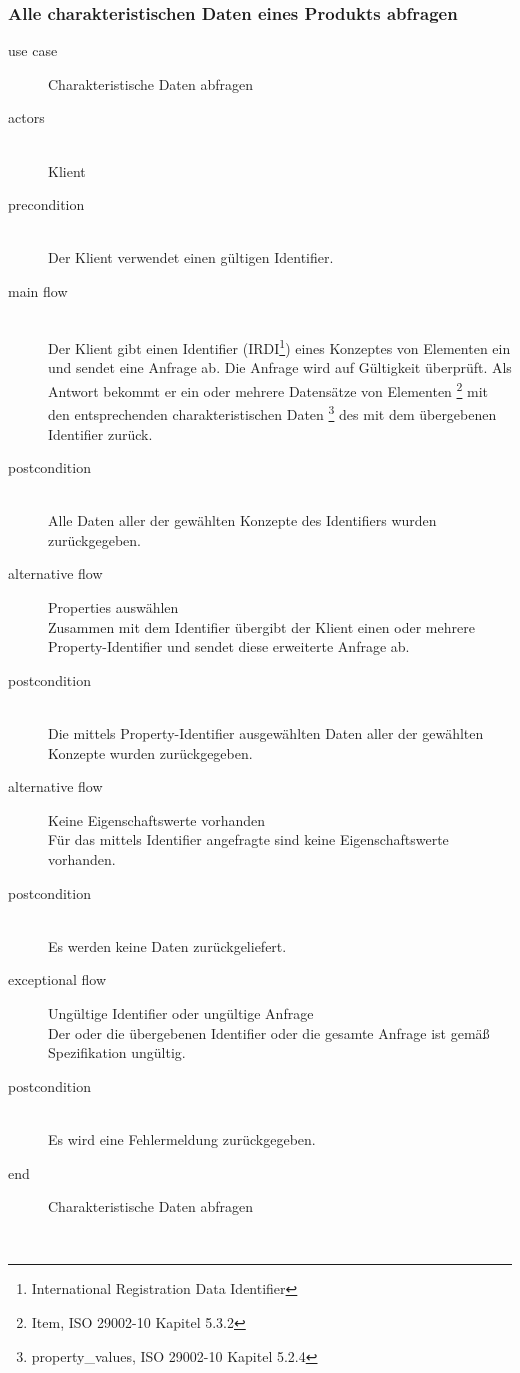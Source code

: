 \subsubsection{Alle charakteristischen Daten eines Produkts abfragen}

{\small

\begin{description}
     \item[use case] Charakteristische Daten abfragen
     \item[  actors]~\\
     Klient
     \item[  precondition]~\\
     Der Klient verwendet einen gültigen Identifier.
     \item[  main flow]~\\
     Der Klient gibt einen Identifier (IRDI\footnote{International Registration Data Identifier}) eines Konzeptes von Elementen ein und sendet eine Anfrage ab. Die Anfrage wird auf Gültigkeit überprüft. Als Antwort bekommt er ein oder mehrere Datensätze von Elementen \footnote{Item, ISO 29002-10 Kapitel 5.3.2} mit den entsprechenden charakteristischen Daten \footnote{property\_values, ISO 29002-10 Kapitel 5.2.4} des  mit dem übergebenen Identifier zurück.
     \item[  postcondition]~\\
     Alle Daten aller   der gewählten Konzepte des Identifiers wurden zurückgegeben.    
     \item[  alternative flow] Properties auswählen ~\\
     Zusammen mit dem Identifier übergibt der Klient einen oder mehrere Property-Identifier und sendet diese erweiterte Anfrage ab.    
     \item[  postcondition]~\\
     Die mittels Property-Identifier ausgewählten Daten aller   der gewählten Konzepte wurden zurückgegeben.    
     \item[  alternative flow] Keine Eigenschaftswerte vorhanden ~\\
     Für das mittels Identifier angefragte  sind keine Eigenschaftswerte vorhanden.    
     \item[  postcondition]~\\
     Es werden keine Daten zurückgeliefert.   
     \item[  exceptional flow] Ungültige Identifier oder ungültige Anfrage ~\\
     Der oder die übergebenen Identifier oder die gesamte Anfrage ist gemäß Spezifikation ungültig.  
     \item[  postcondition]~\\
     Es wird eine Fehlermeldung zurückgegeben.  
     \item[end] Charakteristische Daten abfragen
\end{description}

~\\

} %

